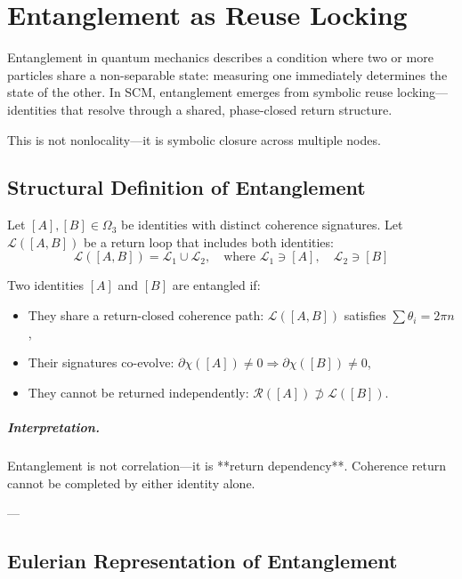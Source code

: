 \chapter{Entanglement as Reuse Locking} \label{chapter:entanglement}

Entanglement in quantum mechanics describes a condition where two or more particles share a non-separable state: measuring one immediately determines the state of the other. In SCM, entanglement emerges from symbolic reuse locking—identities that resolve through a shared, phase-closed return structure.

This is not nonlocality—it is symbolic closure across multiple nodes.

\section{Structural Definition of Entanglement}

Let $[A], [B] \in \Omega_3$ be identities with distinct coherence signatures. Let $\mathcal{L}([A,B])$ be a return loop that includes both identities:
\[
\mathcal{L}([A,B]) = \mathcal{L}_1 \cup \mathcal{L}_2,\quad \text{where } \mathcal{L}_1 \ni [A],\quad \mathcal{L}_2 \ni [B]
\]

\begin{definition}
Two identities $[A]$ and $[B]$ are entangled if:
\begin{itemize}
  \item They share a return-closed coherence path: $\mathcal{L}([A,B])$ satisfies $\sum \theta_i = 2\pi n$,
  \item Their signatures co-evolve: $\partial \chi([A]) \ne 0 \Rightarrow \partial \chi([B]) \ne 0$,
  \item They cannot be returned independently: $\mathcal{R}([A]) \not\supset \mathcal{L}([B])$.
\end{itemize}
\end{definition}

\paragraph{Interpretation.}  
Entanglement is not correlation—it is **return dependency**. Coherence return cannot be completed by either identity alone.

---

\section{Eulerian Representation of Entanglement}

